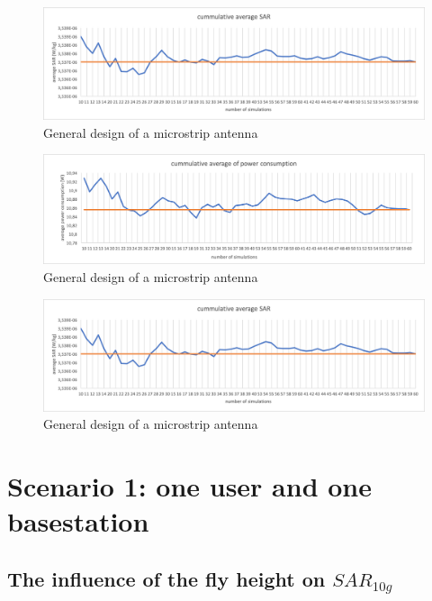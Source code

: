\begin{figure}[th!]
  \includegraphics[width=\textwidth]{../results/numberOfSim/sarvssim.png}
  \caption{General design of a microstrip antenna}
  \label{fig:fhsar}
\end{figure}
\begin{figure}[th!]
  \includegraphics[width=\textwidth]{../results/numberOfSim/pcvssim.png}
  \caption{General design of a microstrip antenna}
  \label{fig:fhsar}
\end{figure}
\begin{figure}[th!]
  \includegraphics[width=\textwidth]{../results/numberOfSim/sarvssim.png}
  \caption{General design of a microstrip antenna}
  \label{fig:fhsar}
\end{figure}

\section{Scenario 1: one user and one basestation}


\subsection{The influence of the fly height on $SAR_{10g}$}
\label{sub:senario1_influenceOfFlyHeight}

